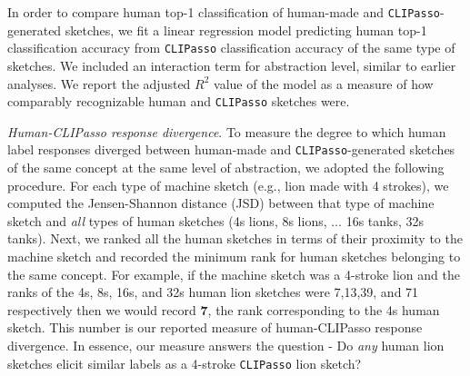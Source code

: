 \documentclass{article}
\begin{document}
In order to compare human top-1 classification of human-made and \texttt{CLIPasso}-generated sketches, we fit a linear regression model predicting human top-1 classification accuracy from \texttt{CLIPasso} classification accuracy of the same type of sketches. We included an interaction term for abstraction level, similar to earlier analyses. We report the adjusted $R^2$ value of the model as a measure of how comparably recognizable human and \texttt{CLIPasso} sketches were.

\textit{Human-CLIPasso response divergence}. To measure the degree to which human label responses diverged between human-made and \texttt{CLIPasso}-generated sketches of the same concept at the same level of abstraction, we adopted the following procedure. For each type of machine sketch (e.g., lion made with 4 strokes), we computed the Jensen-Shannon distance (JSD) between that type of machine sketch and \textit{all} types of human sketches (4s lions, 8s lions, $\ldots$ 16s tanks, 32s tanks). Next, we ranked all the human sketches in terms of their proximity to the machine sketch and recorded the minimum rank for human sketches belonging to the same concept. For example, if the machine sketch was a 4-stroke lion and the ranks of the 4s, 8s, 16s, and 32s human lion sketches were 7,13,39, and 71 respectively then we would record \textbf{7}, the rank corresponding to the 4s human sketch.
This number is our reported measure of human-CLIPasso response divergence. In essence, our measure answers the question - Do \textit{any} human lion sketches elicit similar labels as a 4-stroke \texttt{CLIPasso} lion sketch?
\end{document}
